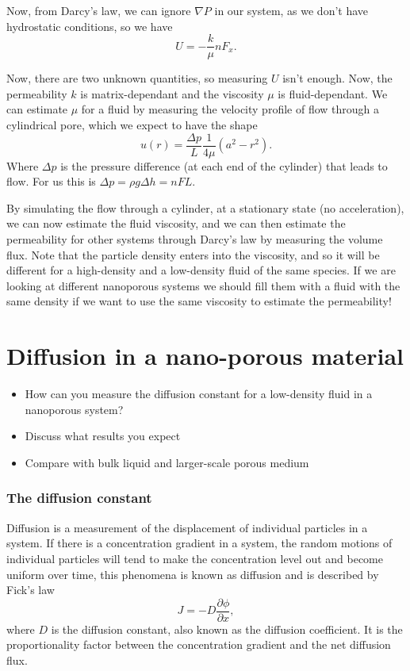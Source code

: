 \documentclass[a4paper, 11pt, notitlepage, english]{article}
\newcommand{\p}{\partial}
\begin{document}
Now, from Darcy's law, we can ignore $\nabla P$ in our system, as we don't have hydrostatic conditions, so we have
$$U = -\frac{k}{\mu}nF_x.$$

Now, there are two unknown quantities, so measuring $U$ isn't enough. Now, the permeability $k$ is matrix-dependant and the viscosity $\mu$ is fluid-dependant. We can estimate $\mu$ for a fluid by measuring the velocity profile of flow through a cylindrical pore, which we expect to have the shape
$$u(r) = \frac{\Delta p}{L} \frac{1}{4\mu}(a^2 - r^2).$$
Where $\Delta p$ is the pressure difference (at each end of the cylinder) that leads to flow. For us this is $\Delta p = \rho g \Delta h = nFL$. 

By simulating the flow through a cylinder, at a stationary state (no acceleration), we can now estimate the fluid viscosity, and we can then estimate the permeability for other systems through Darcy's law by measuring the volume flux. Note that the particle density enters into the viscosity, and so it will be different for a high-density and a low-density fluid of the same species. If we are looking at different nanoporous systems we should fill them with a fluid with the same density if we want to use the same viscosity to estimate the permeability!


\clearpage


\section{Diffusion in a nano-porous material}
\begin{itemize}
\item How can you measure the diffusion constant for a low-density fluid in a nanoporous system? 
\item Discuss what results you expect
\item Compare with bulk liquid and larger-scale porous medium
\end{itemize}

\subsubsection*{The diffusion constant}

Diffusion is a measurement of the displacement of individual particles in a system. If there is a concentration gradient in a system, the random motions of individual particles will tend to make the concentration level out and become uniform over time, this phenomena is known as diffusion and is described by Fick's law
$$J = -D\frac{\p \phi}{\p x},$$
where $D$ is the diffusion constant, also known as the diffusion coefficient. It is the proportionality factor between the concentration gradient and the net diffusion flux.
\end{document}
